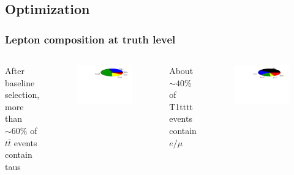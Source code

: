 \documentclass{beamer}
\begin{document}
\subsection{Optimization}
\begin{frame}
  \frametitle{Lepton composition at truth level}
  \begin{columns}[c] %
    After baseline selection, more than $\sim60\%$ of $t\bar{t}$
    events contain taus
    \begin{figure}
      \includegraphics[width=1.2\textwidth]{figures/jacks_Studies/lepton_piechart_ttbar_baseline_117}
    \end{figure}
    About $\sim40\%$ of T1tttt events contain $e/\mu$
    \begin{figure}
      \includegraphics[width=1.2\textwidth]{figures/jacks_Studies/lepton_piechart_t1tttt_1500_100_baseline_117}

\end{figure}
\end{columns}
\end{frame}
\end{document}
